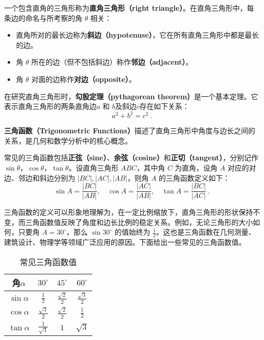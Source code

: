 一个包含直角的三角形称为\textbf{直角三角形（right triangle）}。在直角三角形中，每条边的命名与所考察的角 $\theta$ 相关：
\begin{itemize}
\item 直角所对的最长边称为\textbf{斜边（hypotenuse）}，它在所有直角三角形中都是最长的边。
\item 角 $\theta$ 所在的边（但不包括斜边）称作\textbf{邻边（adjacent）}。
\item 角 $\theta$ 对面的边称作\textbf{对边（opposite）}。
\end{itemize}

在研究直角三角形时，\textbf{勾股定理（pythagorean theorem）}是一个基本定理。它表示直角三角形的两条直角边$a$ 和 $b$及斜边$c$存在如下关系：
\begin{equation}
a^2 + b^2 = c^2~.
\end{equation}

\textbf{三角函数（Trigonometric Functions）}描述了直角三角形中角度与边长之间的关系，是几何和数学分析中的核心概念。

常见的三角函数包括\textbf{正弦（sine）}、\textbf{余弦（cosine）}和\textbf{正切（tangent）}，分别记作 $\sin\theta$，$\cos\theta$，$\tan\theta$。设直角三角形 $ABC$，其中角 $C$ 为直角，设角 $A$ 对应的对边、邻边和斜边分别为 $|BC|, |AC|, |AB|$，则角 $A$ 的三角函数定义如下：
\begin{equation}
\sin A = \frac{|BC|}{|AB|}, \quad
\cos A = \frac{|AC|}{|AB|}, \quad
\tan A = \frac{|BC|}{|AC|}~.
\end{equation}

三角函数的定义可以形象地理解为，在一定比例缩放下，直角三角形的形状保持不变，而三角函数值反映了角度和边长比例的稳定关系。例如，无论三角形的大小如何，只要角 $A = 30^\circ$，那么 $\sin 30^\circ$ 的值始终为 $\frac{1}{2}$。这也是三角函数在几何测量、建筑设计、物理学等领域广泛应用的原因。下面给出一些常见的三角函数值。

\begin{table}[ht]
\centering
\caption{常见三角函数值}\label{tab_HsGeBa1}
\begin{tabular}{|c|c|c|c|}
\hline
角$\alpha$ & $30^{\circ}$ & $45^{\circ}$ & $60^{\circ}$ \\
\hline
$\sin\alpha$ & $\displaystyle\frac{1}{2}$ & $\displaystyle\frac{\sqrt{2}}{2}$ & $\displaystyle\frac{\sqrt{3}}{2}$ \\
\hline
$\cos\alpha$ & $\displaystyle\frac{\sqrt{3}}{2}$& $\displaystyle\frac{\sqrt{2}}{2}$ &  $\displaystyle\frac{1}{2}$ \\
\hline
$\tan\alpha$ & $\displaystyle\frac{1}{\sqrt{3}}$ & $1$ & $\sqrt{3}$ \\
\hline
\end{tabular}
\end{table}


